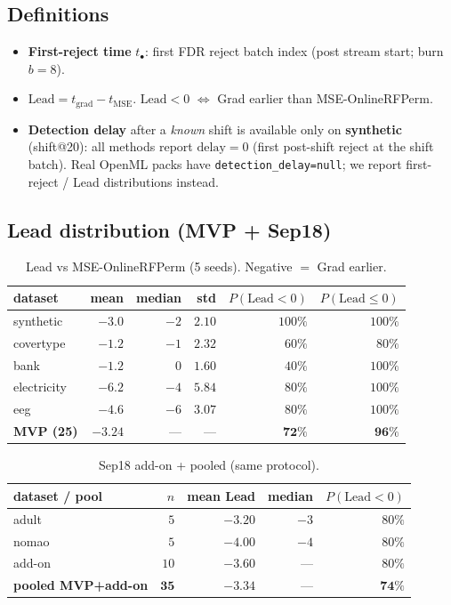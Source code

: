 \documentclass[11pt]{article}
\newcommand{\Lead}{\mathrm{Lead}}
\begin{document}
\subsection{Definitions}
\begin{itemize}[leftmargin=*,itemsep=0.25em]
  \item \textbf{First-reject time} $t_{\bullet}$: first FDR reject batch
        index (post stream start; burn $b{=}8$).
  \item $\displaystyle\Lead=t_{\mathrm{grad}}-t_{\mathrm{MSE}}$.
        $\Lead<0$ $\Leftrightarrow$ Grad earlier than MSE-OnlineRFPerm.
  \item \textbf{Detection delay} after a \emph{known} shift is available
        only on \textbf{synthetic} (shift@20): all methods report
        $\mathrm{delay}=0$ (first post-shift reject at the shift batch).
        Real OpenML packs have \texttt{detection\_delay=null}; we report
        first-reject / Lead distributions instead.
\end{itemize}

\subsection{Lead distribution (MVP + Sep18)}
\begin{table}[h]
\centering
\caption{Lead vs MSE-OnlineRFPerm (5 seeds). Negative $=$ Grad earlier.}
\label{tab:lead-mvp}
\begin{tabular}{lrrrrr}
\toprule
dataset & mean & median & std & $P(\Lead<0)$ & $P(\Lead\le 0)$ \\
\midrule
synthetic   & $-3.0$ & $-2$ & $2.10$ & $100\%$ & $100\%$ \\
covertype   & $-1.2$ & $-1$ & $2.32$ & $60\%$  & $80\%$ \\
bank        & $-1.2$ & $0$  & $1.60$ & $40\%$  & $100\%$ \\
electricity & $-6.2$ & $-4$ & $5.84$ & $80\%$  & $100\%$ \\
eeg         & $-4.6$ & $-6$ & $3.07$ & $80\%$  & $100\%$ \\
\midrule
\textbf{MVP (25)} & $\mathbf{-3.24}$ & --- & --- & $\mathbf{72\%}$ & $\mathbf{96\%}$ \\
\bottomrule
\end{tabular}
\end{table}

\begin{table}[h]
\centering
\caption{Sep18 add-on + pooled (same protocol).}
\label{tab:lead-sep18}
\begin{tabular}{lrrrr}
\toprule
dataset / pool & $n$ & mean Lead & median & $P(\Lead<0)$ \\
\midrule
adult & $5$ & $-3.20$ & $-3$ & $80\%$ \\
nomao & $5$ & $-4.00$ & $-4$ & $80\%$ \\
add-on & $10$ & $-3.60$ & --- & $80\%$ \\
\textbf{pooled MVP+add-on} & $\mathbf{35}$ & $\mathbf{-3.34}$ & --- & $\mathbf{74\%}$ \\
\bottomrule
\end{tabular}
\end{table}
\end{document}
